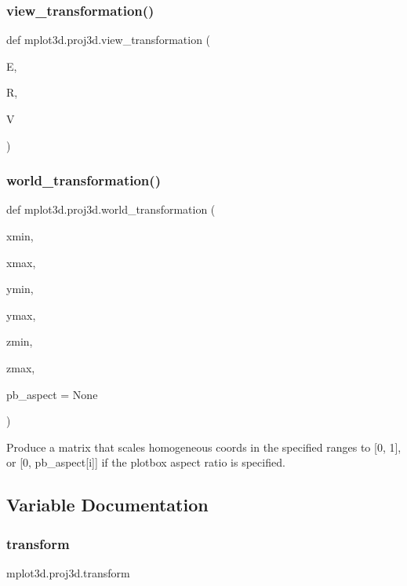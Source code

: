 \mbox{\label{namespacemplot3d_1_1proj3d_ad0cac9544a91b97ea52fde44db35b499}} 
\subsubsection{\texorpdfstring{view\+\_\+transformation()}{view\_transformation()}}
{\footnotesize\ttfamily def mplot3d.\+proj3d.\+view\+\_\+transformation (\begin{DoxyParamCaption}\item[{}]{E,  }\item[{}]{R,  }\item[{}]{V }\end{DoxyParamCaption})}

\mbox{\label{namespacemplot3d_1_1proj3d_a7f12ed00fb7310006b4a8fa48d121597}} 
\subsubsection{\texorpdfstring{world\+\_\+transformation()}{world\_transformation()}}
{\footnotesize\ttfamily def mplot3d.\+proj3d.\+world\+\_\+transformation (\begin{DoxyParamCaption}\item[{}]{xmin,  }\item[{}]{xmax,  }\item[{}]{ymin,  }\item[{}]{ymax,  }\item[{}]{zmin,  }\item[{}]{zmax,  }\item[{}]{pb\+\_\+aspect = {\ttfamily None} }\end{DoxyParamCaption})}

\begin{DoxyVerb}Produce a matrix that scales homogeneous coords in the specified ranges
to [0, 1], or [0, pb_aspect[i]] if the plotbox aspect ratio is specified.
\end{DoxyVerb}
 

\subsection{Variable Documentation}
\mbox{\label{namespacemplot3d_1_1proj3d_ab2c99fedc5ee15b2841e9338fbc5d541}} 
\subsubsection{\texorpdfstring{transform}{transform}}
{\footnotesize\ttfamily mplot3d.\+proj3d.\+transform}

